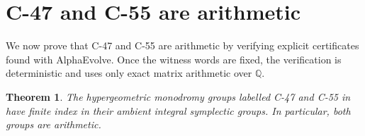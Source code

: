 \documentclass[10pt,a4paper]{amsart}
\newtheorem{theorem}{Theorem}
\newcommand{\QQ}{\mathbb{Q}}
\begin{document}
\section{C-47 and C-55 are arithmetic}

We now prove that C-47 and C-55 are arithmetic by verifying explicit
certificates found with AlphaEvolve.  Once the witness words are fixed, the
verification is deterministic and uses only exact matrix arithmetic over $\QQ$.


\begin{theorem}\label{thm:main}
The hypergeometric monodromy groups labelled C-47 and C-55 in
\cite[Table 3]{BajpaiDonaNitsche2025Thin} have finite index in their ambient
integral symplectic groups.  In particular, both groups are arithmetic.
\end{theorem}
\end{document}
